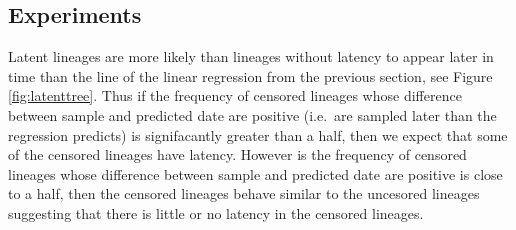 \documentclass[12pt]{article}
\begin{document}
\subsection * {Experiments} \label{subsec:experiments}

%
%
%


Latent lineages are more likely than lineages without latency to appear later in time than the line of the linear regression from the previous section, see Figure \ref{fig:latenttree}.
Thus if the frequency of censored lineages whose difference between sample and predicted date are positive (i.e.~are sampled later than the regression predicts) is signifacantly greater than a half, then we expect that some of the censored lineages have latency.
However is the frequency of censored lineages whose difference between sample and predicted date are positive is close to a half, then the censored lineages behave similar to the uncesored lineages suggesting that there is little or no latency in the censored lineages.
\end{document}
